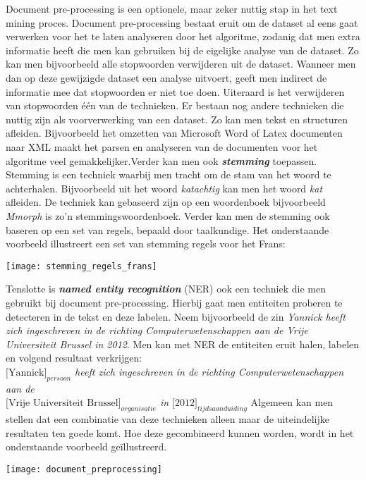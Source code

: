 Document pre-processing is een optionele, maar zeker nuttig stap in het text mining proces. Document pre-processing bestaat eruit om de dataset al eens gaat verwerken voor het te laten analyseren door het algoritme, zodanig dat men extra informatie heeft  die men kan gebruiken bij de eigelijke analyse van de dataset. Zo kan men bijvoorbeeld alle stopwoorden verwijderen uit de dataset. Wanneer men dan op deze gewijzigde dataset een analyse uitvoert, geeft men indirect de informatie mee dat stopwoorden er niet toe doen. Uiteraard is het verwijderen van stopwoorden \'e\'en van de technieken.  Er bestaan nog andere technieken die nuttig zijn als voorverwerking van een dataset. Zo kan men tekst en structuren afleiden. Bijvoorbeeld het omzetten van Microsoft Word of Latex documenten naar XML maakt het parsen en analyseren van de documenten voor het algoritme veel gemakkelijker.Verder kan men ook \textbf{\textit{stemming}} toepassen. Stemming is een techniek waarbij men tracht om de stam van het woord te achterhalen. Bijvoorbeeld uit het woord \textit{katachtig} kan men het woord \textit{kat} afleiden. De techniek kan gebaseerd zijn op een woordenboek bijvoorbeeld \textit{Mmorph} \cite{petitpierre1995mmorph} is zo'n stemmingswoordenboek. Verder kan men de stemming ook baseren op een set van regels, bepaald door taalkundige. Het onderstaande voorbeeld illustreert een set van stemming regels voor het Frans:
\begin{center}
  \texttt{[image: stemming\_regels\_frans]}
\end{center}
Tenslotte is \textbf{\textit{named entity recognition}} (NER) ook een techniek die men gebruikt bij document pre-processing. Hierbij gaat men entiteiten proberen te detecteren in de tekst en deze labelen. Neem bijvoorbeeld de zin \textit{Yannick heeft zich ingeschreven in de richting Computerwetenschappen aan de Vrije Universiteit Brussel in 2012}. Men kan met NER de entiteiten eruit halen, labelen en volgend resultaat verkrijgen:\\ 
\newline
\textit{$\text{[Yannick]}_{persoon}$ heeft zich ingeschreven in de richting Computerwetenschappen aan de\\ $\text{[Vrije Universiteit Brussel]}_{organisatie}$ in $\text{[2012]}_{tijdsaanduiding}$}
\newline
\newline
Algemeen kan men stellen dat een combinatie van deze technieken alleen maar de uiteindelijke resultaten ten goede komt. Hoe deze gecombineerd kunnen worden, wordt in het onderstaande voorbeeld ge\"illustreerd. 
\begin{center}
  \texttt{[image: document\_preprocessing]}
\end{center}
%
